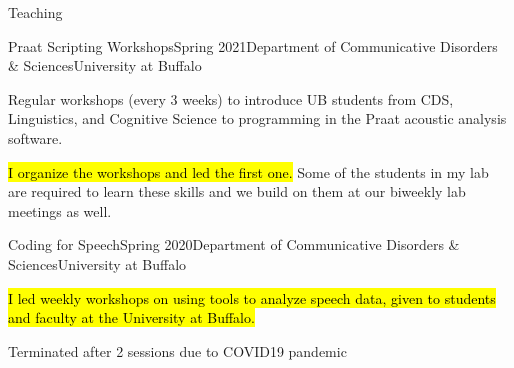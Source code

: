 \documentclass{resume} %
\begin{document}
\begin{rSection}{Teaching}
	\begin{rSubsection}{Praat Scripting Workshops}{Spring 2021}{Department of Communicative Disorders \& Sciences}{University at Buffalo}
		\item Regular workshops (every 3 weeks) to introduce UB students from CDS, Linguistics, and Cognitive Science to programming in the Praat acoustic analysis software.
		\item \hl{I organize the workshops and led the first one.} Some of the students in my lab are required to learn these skills and we build on them at our biweekly lab meetings as well.
	\end{rSubsection}

	\begin{rSubsection}{Coding for Speech}{Spring 2020}{Department of Communicative Disorders \& Sciences}{University at Buffalo}
		\item \hl{I led weekly workshops on using tools to analyze speech data, given to students and faculty at the University at Buffalo.}
		\item Terminated after 2 sessions due to COVID19 pandemic
	\end{rSubsection}


%	
%	
%	
%	
%	


\end{rSection}
\end{document}
